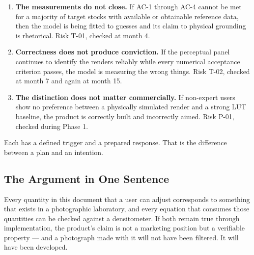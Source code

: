\begin{enumerate}
\item \textbf{The measurements do not close.} If AC-1 through AC-4 cannot be
met for a majority of target stocks with available or obtainable reference data,
then the model is being fitted to guesses and its claim to physical grounding is
rhetorical. Risk T-01, checked at month 4.
\item \textbf{Correctness does not produce conviction.} If the perceptual panel
continues to identify the renders reliably while every numerical acceptance
criterion passes, the model is measuring the wrong things. Risk T-02, checked at
month 7 and again at month 15.
\item \textbf{The distinction does not matter commercially.} If non-expert users
show no preference between a physically simulated render and a strong LUT
baseline, the product is correctly built and incorrectly aimed. Risk P-01,
checked during Phase 1.
\end{enumerate}

Each has a defined trigger and a prepared response. That is the difference
between a plan and an intention.

\subsection{The Argument in One Sentence}

Every quantity in this document that a user can adjust corresponds to something
that exists in a photographic laboratory, and every equation that consumes those
quantities can be checked against a densitometer. If both remain true through
implementation, the product's claim is not a marketing position but a
verifiable property --- and a photograph made with it will not have been
filtered. It will have been developed.
